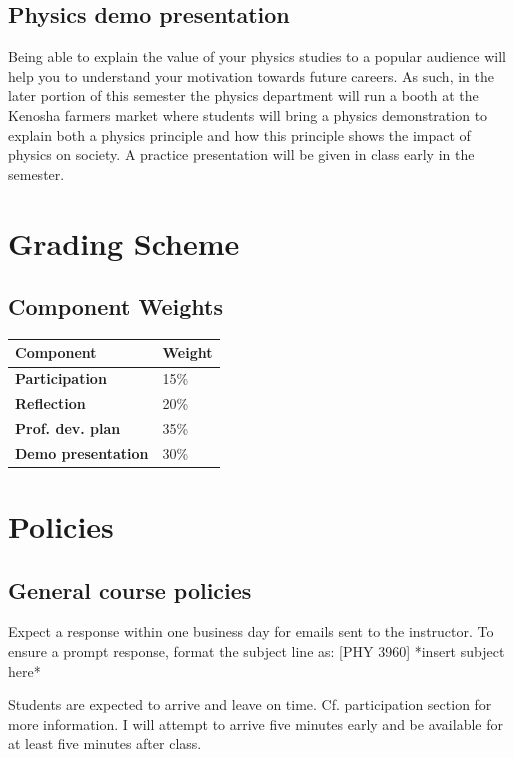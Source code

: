 \documentclass{syllabus}
\begin{document}
\subsection{Physics demo presentation} 
Being able to explain the value of your physics studies to a popular audience will help you to understand your motivation towards future careers. As such, in the later portion of this semester the physics department will run a booth at the Kenosha farmers market where students will bring a physics demonstration to explain both a physics principle and how this principle shows the impact of physics on society. A practice presentation will be given in class early in the semester.

\section*{Grading Scheme}
\subsection*{Component Weights}

\noindent\begin{tabular}{ll}
\textbf{Component} & \textbf{Weight}       \\ \hline
\textbf{Participation}            & 15\%  \\
\textbf{Reflection}            & 20\%       \\
\textbf{Prof. dev. plan}            &     35\%   \\
\textbf{Demo presentation}            & 30\%       \\
\end{tabular}%




\section*{Policies}
\subsection{General course policies}
Expect a response within one business day for emails sent to the instructor. To ensure a prompt response, format the subject line as: [PHY 3960] *insert subject here*

Students are expected to arrive and leave on time. Cf. participation section for more information. I will attempt to arrive five minutes early and be available for at least five minutes after class.

\end{document}
